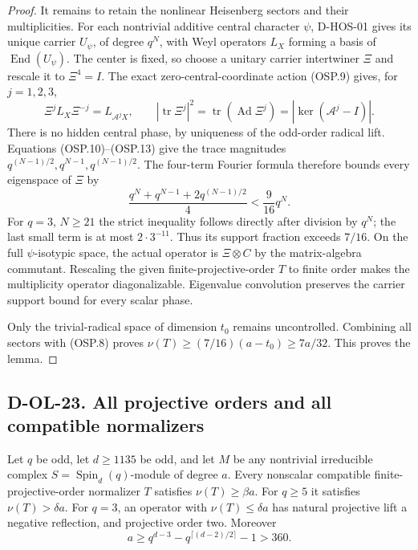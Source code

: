 \begin{proof}
It remains to retain the nonlinear Heisenberg sectors and
their multiplicities.  For each nontrivial additive central
character $\psi$, D-HOS-01 gives its unique carrier $U_\psi$,
of degree $q^N$, with Weyl operators $L_X$ forming a basis
of $\operatorname{End}(U_\psi)$.  The center is fixed, so
choose a unitary carrier intertwiner $\Xi$ and rescale it to
$\Xi^4=I$.  The exact zero-central-coordinate action (OSP.9)
gives, for $j=1,2,3$,
\[
 \Xi^jL_X\Xi^{-j}=L_{\mathcal A^jX},\qquad
 |\operatorname{tr}\Xi^j|^2
   =\operatorname{tr}(\operatorname{Ad}\Xi^j)
   =|\ker(\mathcal A^j-I)|.                                \tag{OSP.13}
\]
There is no hidden central phase, by uniqueness of the
odd-order radical lift.  Equations (OSP.10)--(OSP.13) give
the trace magnitudes
$q^{(N-1)/2},q^{N-1},q^{(N-1)/2}$.
The four-term Fourier formula therefore bounds every
eigenspace of $\Xi$ by
\[
 \frac{q^N+q^{N-1}+2q^{(N-1)/2}}4
       <\frac9{16}q^N.                                    \tag{OSP.14}
\]
For $q=3$, $N\ge21$ the strict inequality follows directly
after division by $q^N$; the last small term is at most
$2\cdot3^{-11}$.  Thus its support fraction exceeds $7/16$.
On the full $\psi$-isotypic space, the actual operator is
$\Xi\otimes C$ by the matrix-algebra commutant.  Rescaling the
given finite-projective-order $T$ to finite order makes the
multiplicity operator diagonalizable.  Eigenvalue convolution
preserves the carrier support bound for every scalar phase.

Only the trivial-radical space of dimension $t_0$ remains
uncontrolled.  Combining all sectors with (OSP.8) proves
$\nu(T)\ge(7/16)(a-t_0)\ge7a/32$.  This proves the lemma.
\end{proof}

\subsection*{D-OL-23. All projective orders and all compatible normalizers}

\begin{theorem}[D-OL-23]
Let $q$ be odd, let $d\ge1135$ be odd, and let $M$ be any
nontrivial irreducible complex $S=\operatorname{Spin}_d(q)$-module
of degree $a$.  Every nonscalar compatible finite-projective-order
normalizer $T$ satisfies $\nu(T)\ge\beta a$.
For $q\ge5$ it satisfies $\nu(T)>\delta a$.
For $q=3$, an operator with $\nu(T)\le\delta a$ has natural
projective lift a negative reflection, and projective order two.
Moreover
\[
                   a\ge q^{d-3}-q^{\lceil(d-2)/2\rceil}-1>360.
 \tag{OSP.15}
\]
\end{theorem}

